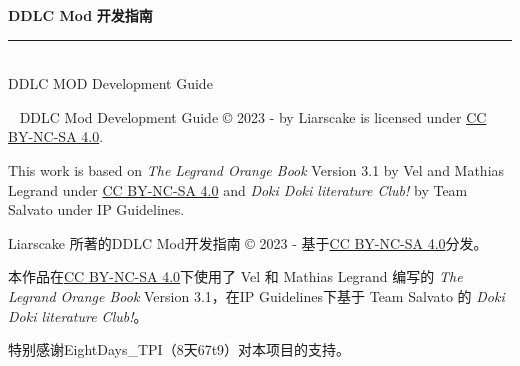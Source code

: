 \documentclass[../Main.tex]{subfiles}
\begin{document}
\thispagestyle{empty}

\begin{titlepage}{




\noindent\begin{minipage}{\textwidth}
\raggedright
{\fontsize{60pt}{1.2} \bfseries DDLC Mod}
\newline
\newline
{\fontsize{50pt}{1.2} \bfseries 开发指南}
\noindent\rule[-1ex]{\textwidth}{5pt}\\[2.5ex]
\Large {DDLC MOD Development Guide\newline} \hfill

{\bfseries {}}
\newline
{\bfseries {}}
\end{minipage}


\newpage
\thispagestyle{empty}
~\vfill
\small
\noindent DDLC Mod Development Guide {\copyright} 2023 - {\the\year} by Liarscake is licensed under \href{https://creativecommons.org/licenses/by-nc-sa/4.0/}{CC BY-NC-SA 4.0}.

\noindent This work is based on \textit{The Legrand Orange Book} Version 3.1 by Vel and Mathias Legrand under \href{https://creativecommons.org/licenses/by-nc-sa/4.0/}{CC BY-NC-SA 4.0} and \textit{Doki Doki literature Club!} by Team Salvato under IP Guidelines.

\noindent Liarscake 所著的DDLC Mod开发指南 {\copyright} 2023 - {\the\year}基于\href{https://creativecommons.org/licenses/by-nc-sa/4.0/}{CC BY-NC-SA 4.0}分发。

\noindent 本作品在\href{https://creativecommons.org/licenses/by-nc-sa/4.0/}{CC BY-NC-SA 4.0}下使用了 Vel 和 Mathias Legrand 编写的 \textit{The Legrand Orange Book} Version 3.1，在IP Guidelines下基于 Team Salvato 的 \textit{Doki Doki literature Club!}。

\noindent 特别感谢EightDays\_TPI（8天67t9）对本项目的支持。
}
\end{titlepage}
\end{document}
